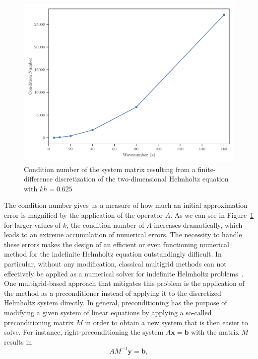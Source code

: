 \begin{figure}
		\centering
		\includegraphics[width=\textwidth]{figures/cond.pdf}
		\caption{Condition number of the system matrix resulting from a finite-difference discretization of the two-dimensional Helmholtz equation with $kh = 0.625$}
		\label{fig:condition-number-helmholtz}
\end{figure}
The condition number gives us a measure of how much an initial approximation error is magnified by the application of the operator $A$.
As we can see in Figure~\ref{fig:condition-number-helmholtz} for larger values of $k$, the condition number of $A$ increases dramatically, which leads to an extreme accumulation of numerical errors. 
The necessity to handle these errors makes the design of an efficient or even functioning numerical method for the indefinite Helmholtz equation outstandingly difficult.
In particular, without any modification, classical multigrid methods can not effectively be applied as a numerical solver for indefinite Helmholtz problems~\cite{ernst2012difficult}.
One multigrid-based approach that mitigates this problem is the application of the method as a preconditioner instead of applying it to the discretized Helmholtz system directly.
In general, preconditioning has the purpose of modifying a given system of linear equations by applying a so-called preconditioning matrix $M$ in order to obtain a new system that is then easier to solve.
For instance, right-preconditioning the system $A \bm{x} = \bm{b}$ with the matrix $M$ results in
\begin{equation}
	A M^{-1} \bm{y} = \bm{b},
	\label{eq:right-preconditioning}
\end{equation}
